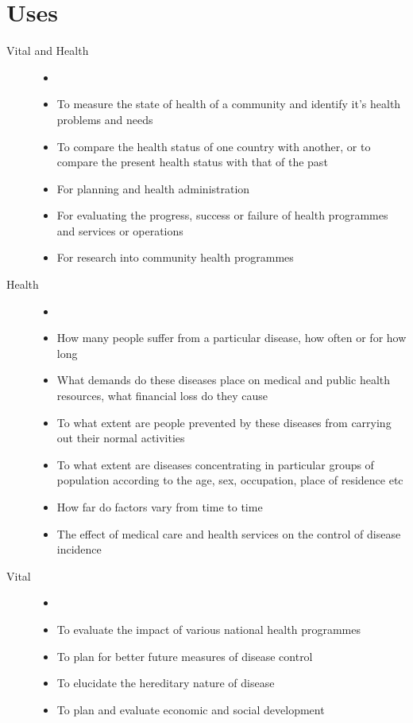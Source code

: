 \documentclass[
10pt, %
a4paper, %
]{report}
\begin{document}
\section*{Uses}
\begin{description}
\item[Vital and Health]
\begin{itemize}
\item[]
\item To measure the state of health of a community and identify it’s health problems and needs
\item To compare the health status of one country with another, or to compare the present health status with that of the past
\item For planning and health administration
\item For evaluating the progress, success or failure of health programmes and services or operations
\item For research into community health programmes
\end{itemize}
\item[Health]
\begin{itemize}
\item[]
\item How many people suffer from a particular disease, how often or for how long
\item What demands do these diseases place on medical and public health resources, what financial loss do they cause
\item To what extent are people prevented by these diseases from carrying out their normal activities
\item To what extent are diseases concentrating in particular groups of population according to the age, sex, occupation, place of residence etc
\item How far do factors vary from time to time
\item The effect of medical care and health services on the control of disease incidence
\end{itemize}
\item[Vital]
\begin{itemize}
\item[]
\item To evaluate the impact of various national health programmes
\item To plan for better future measures of disease control
\item To elucidate the hereditary nature of disease
\item To plan and evaluate economic and social development

\end{itemize}
\end{description}
\end{document}
